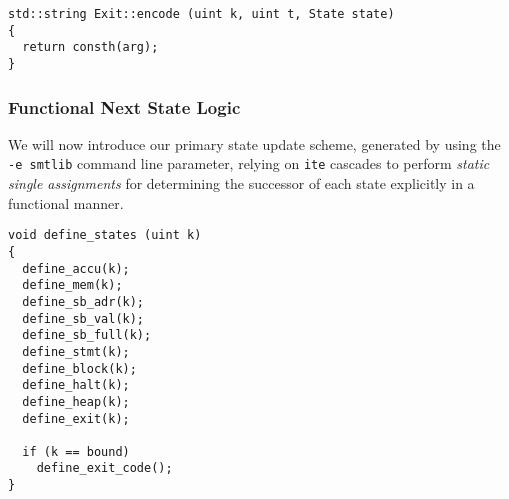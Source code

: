 
\begin{lstlisting}[style=c++, style=encode]
std::string Exit::encode (uint k, uint t, State state)
{
  return consth(arg);
}
\end{lstlisting}

\subsubsection{Functional Next State Logic}


\noindent
We will now introduce our primary state update scheme, generated by using the \texttt{-e smtlib} command line parameter,
relying on \texttt{ite} cascades to perform \emph{static single assignments} for determining the successor of each state explicitly in a functional manner.%


\begin{lstlisting}[style=c++]
void define_states (uint k)
{
  define_accu(k);
  define_mem(k);
  define_sb_adr(k);
  define_sb_val(k);
  define_sb_full(k);
  define_stmt(k);
  define_block(k);
  define_halt(k);
  define_heap(k);
  define_exit(k);

  if (k == bound)
    define_exit_code();
}
\end{lstlisting}

